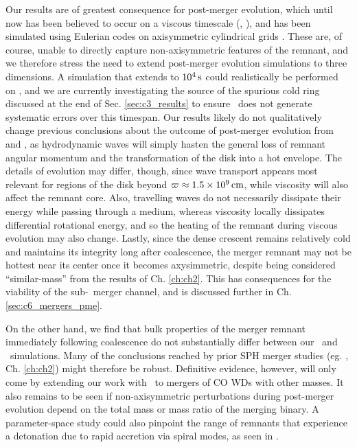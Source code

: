 Our results are of greatest consequence for post-merger evolution, which until now has been believed to occur on a viscous timescale (\citeal{vkercj10}, \citealt{shen+12}), and has been simulated using Eulerian codes on axisymmetric cylindrical grids \citep{schw+12,ji+13}.  These are, of course, unable to directly capture non-axisymmetric features of the remnant, and we therefore stress the need to extend post-merger evolution simulations to three dimensions.  A simulation that extends to $10^4\,\mathrm{s}$ could realistically be performed on \arepo, and we are currently investigating the source of the spurious cold ring discussed at the end of Sec. \ref{sec:c3_results} to ensure \arepo\ does not generate systematic errors over this timespan.  Our results likely do not qualitatively change previous conclusions about the outcome of post-merger evolution from \cite{schw+12} and \cite{ji+13}, as hydrodynamic waves will simply hasten the general loss of remnant angular momentum and the transformation of the disk into a hot envelope.  The details of evolution may differ, though, since wave transport appears most relevant for regions of the disk beyond $\varpi \approx 1.5\times10^9\,\mathrm{cm}$, while viscosity will also affect the remnant core.  Also, travelling waves do not necessarily dissipate their energy while passing through a medium, whereas viscosity locally dissipates differential rotational energy, and so the heating of the remnant during viscous evolution may also change.  Lastly, since the dense crescent remains relatively cold and maintains its integrity long after coalescence, the merger remnant may not be hottest near its center once it becomes axysimmetric, despite being considered ``similar-mass'' from the results of Ch. \ref{ch:ch2}.  This has consequences for the viability of the sub-\Mch\ merger channel, and is discussed further in Ch. \ref{sec:c6_mergers_pme}.

On the other hand, we find that bulk properties of the merger remnant immediately following coalescence do not substantially differ between our \gasoline\ and \arepo\ simulations.  Many of the conclusions reached by prior SPH merger studies (eg. \citeal{loreig09}, Ch. \ref{ch:ch2}) might therefore be robust.  Definitive evidence, however, will only come by extending our work with \arepo\ to mergers of CO WDs with other masses.  It also remains to be seen if non-axisymmetric perturbations during post-merger evolution depend on the total mass or mass ratio of the merging binary.  A parameter-space study could also pinpoint the range of remnants that experience a detonation due to rapid accretion via spiral modes, as seen in \cite{kash+15}.

